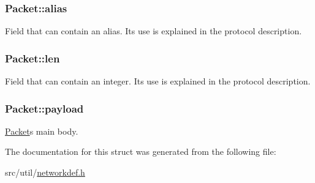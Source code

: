 \subsubsection[{\texorpdfstring{alias}{alias}}]{\setlength{\rightskip}{0pt plus 5cm}Packet\+::alias}\hypertarget{structPacket_ac20e801b8bbe165a85317fc937d11cf3}{}\label{structPacket_ac20e801b8bbe165a85317fc937d11cf3}
Field that can contain an alias. Its use is explained in the protocol description. 
\subsubsection[{\texorpdfstring{len}{len}}]{\setlength{\rightskip}{0pt plus 5cm}Packet\+::len}\hypertarget{structPacket_a1d26d154760776ebcea98638b0bf1f73}{}\label{structPacket_a1d26d154760776ebcea98638b0bf1f73}
Field that can contain an integer. Its use is explained in the protocol description. 
\subsubsection[{\texorpdfstring{payload}{payload}}]{\setlength{\rightskip}{0pt plus 5cm}Packet\+::payload}\hypertarget{structPacket_a819db228469a8fd8beb62114dbfaed56}{}\label{structPacket_a819db228469a8fd8beb62114dbfaed56}
\hyperlink{structPacket}{Packet}\textquotesingle{}s main body. 

The documentation for this struct was generated from the following file\+:\begin{DoxyCompactItemize}
\item 
src/util/\hyperlink{networkdef_8h}{networkdef.\+h}\end{DoxyCompactItemize}

